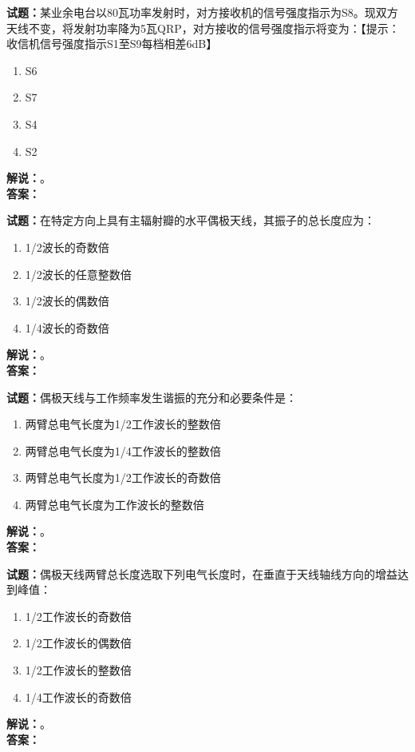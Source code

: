 \documentclass{ctexbook}
\begin{document}
\bigskip




\noindent\textbf{试题：}某业余电台以80瓦功率发射时，对方接收机的信号强度指示为S8。现双方天线不变，将发射功率降为5瓦QRP，对方接收的信号强度指示将变为：【提示：收信机信号强度指示S1至S9每档相差6dB】
\begin{enumerate}[leftmargin=3em]
\item S6
\item S7
\item S4
\item S2
\end{enumerate}
\noindent\textbf{解说：}\textbf{}。\\\noindent\textbf{答案：}

\bigskip




\noindent\textbf{试题：}在特定方向上具有主辐射瓣的水平偶极天线，其振子的总长度应为：
\begin{enumerate}[leftmargin=3em]
\item 1/2波长的奇数倍
\item 1/2波长的任意整数倍
\item 1/2波长的偶数倍
\item 1/4波长的奇数倍
\end{enumerate}
\noindent\textbf{解说：}\textbf{}。\\\noindent\textbf{答案：}

\bigskip




\noindent\textbf{试题：}偶极天线与工作频率发生谐振的充分和必要条件是：
\begin{enumerate}[leftmargin=3em]
\item 两臂总电气长度为1/2工作波长的整数倍
\item 两臂总电气长度为1/4工作波长的整数倍
\item 两臂总电气长度为1/2工作波长的奇数倍
\item 两臂总电气长度为工作波长的整数倍
\end{enumerate}
\noindent\textbf{解说：}\textbf{}。\\\noindent\textbf{答案：}

\bigskip




\noindent\textbf{试题：}偶极天线两臂总长度选取下列电气长度时，在垂直于天线轴线方向的增益达到峰值：
\begin{enumerate}[leftmargin=3em]
\item 1/2工作波长的奇数倍
\item 1/2工作波长的偶数倍
\item 1/2工作波长的整数倍
\item 1/4工作波长的奇数倍
\end{enumerate}
\noindent\textbf{解说：}\textbf{}。\\\noindent\textbf{答案：}
\end{document}
